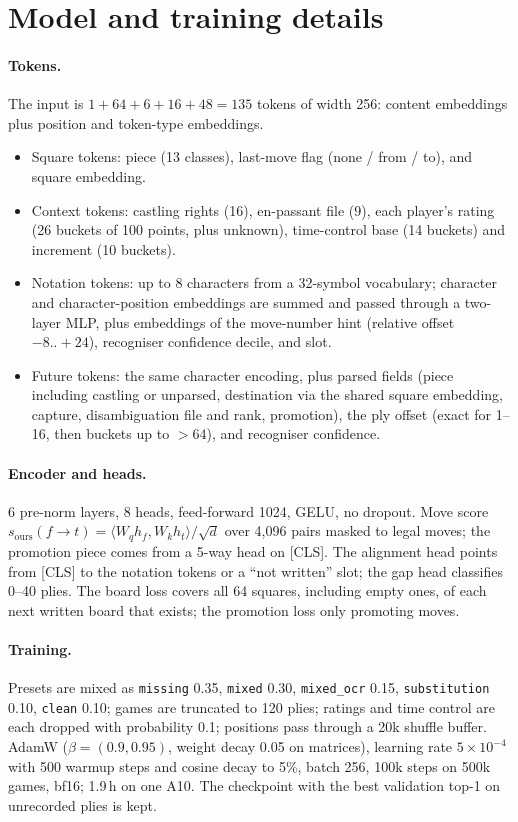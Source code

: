 \documentclass[11pt]{article}
\begin{document}
\section{Model and training details}
\label{app:model}
\paragraph{Tokens.} The input is $1+64+6+16+48=135$ tokens of width 256: content embeddings plus position and token-type embeddings.
\begin{itemize}
  \item Square tokens: piece (13 classes), last-move flag (none / from / to), and square embedding.
  \item Context tokens: castling rights (16), en-passant file (9), each player's rating (26 buckets of 100 points, plus unknown), time-control base (14 buckets) and increment (10 buckets).
  \item Notation tokens: up to 8 characters from a 32-symbol vocabulary; character and character-position embeddings are summed and passed through a two-layer MLP, plus embeddings of the move-number hint (relative offset $-8..{+}24$), recogniser confidence decile, and slot.
  \item Future tokens: the same character encoding, plus parsed fields (piece including castling or unparsed, destination via the shared square embedding, capture, disambiguation file and rank, promotion), the ply offset (exact for 1--16, then buckets up to $>64$), and recogniser confidence.
\end{itemize}
\paragraph{Encoder and heads.} 6 pre-norm layers, 8 heads, feed-forward 1024, GELU, no dropout. Move score $s_{\text{ours}}(f\!\to\!t)=\langle W_q h_f, W_k h_t\rangle/\sqrt d$ over 4,096 pairs masked to legal moves; the promotion piece comes from a 5-way head on [CLS]. The alignment head points from [CLS] to the notation tokens or a ``not written'' slot; the gap head classifies 0--40 plies. The board loss covers all 64 squares, including empty ones, of each next written board that exists; the promotion loss only promoting moves.
\paragraph{Training.} Presets are mixed as \texttt{missing} 0.35, \texttt{mixed} 0.30, \texttt{mixed\_ocr} 0.15, \texttt{substitution} 0.10, \texttt{clean} 0.10; games are truncated to 120 plies; ratings and time control are each dropped with probability 0.1; positions pass through a 20k shuffle buffer. AdamW ($\beta=(0.9,0.95)$, weight decay 0.05 on matrices), learning rate $5\times10^{-4}$ with 500 warmup steps and cosine decay to 5\%, batch 256, 100k steps on 500k games, bf16; 1.9\,h on one A10. The checkpoint with the best validation top-1 on unrecorded plies is kept.
\end{document}
